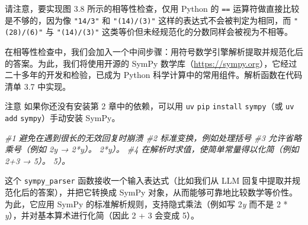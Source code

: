 请注意，要实现图 3.8 所示的相等性检查，仅用 Python 的 \texttt{==} 运算符做直接比较是不够的，因为像 \texttt{"}\texttt{14/3}\texttt{"} 和 \texttt{"}\texttt{(14)/(3)}\texttt{"} 这样的表达式不会被判定为相同，而 \texttt{"}\texttt{(28)/(6)}\texttt{"} 与 \texttt{"}\texttt{(14)/(3)}\texttt{"} 这类等价但未经规范化的分数同样会被视为不相等。

在相等性检查中，我们会加入一个中间步骤：用符号数学引擎解析提取并规范化后的答案。为此，我们将使用开源的 SymPy 数学库（\href{https://sympy.org}{https://sympy.org}），它经过二十多年的开发和检验，已成为 Python 科学计算中的常用组件。解析函数在代码清单 3.7 中实现。

\begin{myWarning}{注意}
 如果你还没有安装第 2 章中的依赖，可以用 \texttt{uv} \texttt{pip} \texttt{install} \texttt{sympy}（或 \texttt{uv} \texttt{add} \texttt{sympy}）手动安装 SymPy。\end{myWarning}

{\noindent\small\textit{\#1 避免在遇到很长的无效回复时崩溃 \newline \#2 标准变换，例如处理括号 \newline \#3 允许省略乘号（例如 2y → 2*y）。 2*y）。 \newline \#4 在解析时求值，使简单常量得以化简（例如 2+3 → 5）。 5）。}\par}

这个 \texttt{sympy\_parser} 函数接收一个输入表达式（比如我们从 LLM 回复中提取并规范化后的答案），并把它转换成 SymPy 对象，从而能够可靠地比较数学等价性。为此，它应用 SymPy 的标准解析规则，支持隐式乘法（例如写 2\emph{y} 而不是 2 * \emph{y}），并对基本算术进行化简（因此 2 + 3 会变成 5）。

